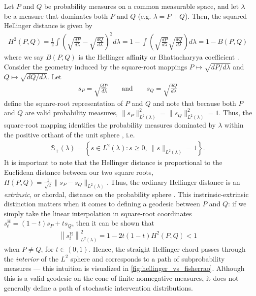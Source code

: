 \documentclass[11pt,twoside]{article}
\theoremstyle{definition}
\theoremstyle{remark}
\begin{document}
Let $P$ and $Q$ be probability measures on a common measurable space, and let $\lambda$ be a measure that dominates both $P$ and $Q$ (e.g. $\lambda = P + Q$). Then, the squared Hellinger distance is given by
\begin{align*}
    H^2(P, Q) = \frac{1}{2} \int \left( \sqrt{\frac{dP}{d\lambda}} - \sqrt{\frac{dQ}{d\lambda}} \right)^2d\lambda = 1 -  \int \left(\sqrt{\frac{dP}{d\lambda}} \sqrt{\frac{dQ}{d\lambda}} \right) d\lambda = 1 - B(P, Q)
\end{align*}
where we say $B(P, Q)$ is the Hellinger affinity or Bhattacharyya coefficient \citep{bhattacharyya1943measure}. Consider the geometry induced by the square-root mappings $P \mapsto \sqrt{ dP / d\lambda}$ and $Q \mapsto \sqrt{ dQ / d\lambda}$. Let
\begin{align*}
    s_P = \sqrt{\frac{dP}{d\lambda}} \qquad \text{and} \qquad s_Q = \sqrt{\frac{dQ}{d\lambda}}
\end{align*}
define the square-root representation of $P$ and $Q$ and note that because both $P$ and $Q$ are valid probability measures, $\| s_P \|^2_{L^2(\lambda)} = \| s_Q \|^2_{L^2(\lambda)} = 1$. Thus, the square-root mapping identifies the probability measures dominated by $\lambda$ within the positive orthant of the unit sphere \citep{Srivastava2007riemannian, srivastava2016functional}, i.e.\ 
\begin{align*}
    \mathbb{S}_+(\lambda) = \left\{ s\in L^2(\lambda): s\geq 0,\  \|s\|_{L^2(\lambda)}=1 \right\}.
\end{align*}
It is important to note that the Hellinger distance is proportional to the Euclidean distance between our two square roots, $ H(P,Q) = \frac{1}{\sqrt{2}} \|s_P-s_Q\|_{L^2(\lambda)}$. Thus, the ordinary Hellinger distance is an \emph{extrinsic}, or chordal, distance on the probability sphere \citep{mielke2025noteshellingerdistancevarious}. This instrinsic-extrinsic distinction matters when it comes to defining a geodesic between $P$ and $Q$: if we simply take the linear interpolation in square-root coordinates $s_t^{\mathrm{H}} = (1-t)s_P+t s_Q$, then it can be shown that
\begin{align*}
    \left\|s_t^{\mathrm{H}}\right\|_{L^2(\lambda)}^2 = 1-2t(1-t)H^2(P,Q) < 1
\end{align*}
when $P \neq Q$, for $t \in (0, 1)$. Hence, the straight Hellinger chord passes through the \textit{interior} of the $L^2$ sphere and corresponds to a path of subprobability measures --- this intuition is visualized in \cref{fig:hellinger_vs_fisherrao}. Although this is a valid geodesic on the cone of finite nonnegative measures, it does not generally define a path of stochastic intervention distributions.
\end{document}
